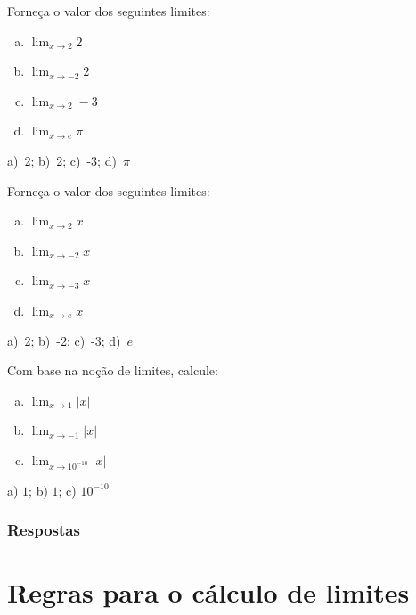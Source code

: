 \begin{exer}
  Forneça o valor dos seguintes limites:
  \begin{enumerate}[a)]
  \item $\displaystyle \lim_{x\to 2} 2$
  \item $\displaystyle \lim_{x\to -2} 2$
  \item $\displaystyle \lim_{x\to 2} -3$
  \item $\displaystyle \lim_{x\to e} \pi$
  \end{enumerate}
\end{exer}
\begin{resp}
  a)~2; b)~2; c)~-3; d)~$\pi$
\end{resp}

\begin{exer}
  Forneça o valor dos seguintes limites:
  \begin{enumerate}[a)]
  \item $\displaystyle \lim_{x\to 2} x$
  \item $\displaystyle \lim_{x\to -2} x$
  \item $\displaystyle \lim_{x\to -3} x$
  \item $\displaystyle \lim_{x\to e} x$
  \end{enumerate}
\end{exer}
\begin{resp}
  a)~2; b)~-2; c)~-3; d)~$e$
\end{resp}

\begin{exer}
  Com base na noção de limites, calcule:
  \begin{enumerate}[a)]
  \item $\displaystyle\lim_{x\to 1} |x|$
  \item $\displaystyle\lim_{x\to -1} |x|$
  \item $\displaystyle\lim_{x\to 10^{-10}} |x|$
  \end{enumerate}
\end{exer}
\begin{resp}
  a) $1$; b) $1$; c) $10^{-10}$
\end{resp}

\ifisbook
\subsubsection{Respostas}
\shipoutAnswer
\fi


\section{Regras para o cálculo de limites}\label{cap_lim_sec_regras}

